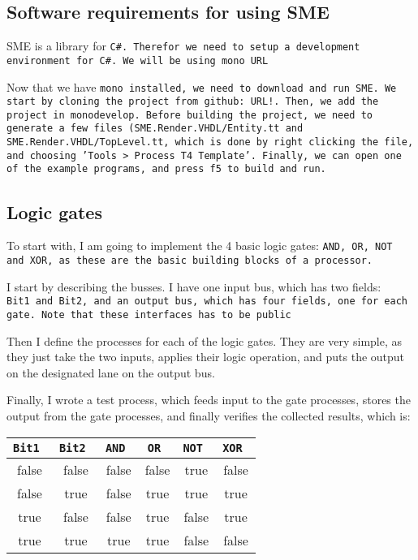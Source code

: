 \subsection{Software requirements for using SME}
SME is a library for \tt{C\#}. Therefor we need to setup a development
environment for \tt{C\#}. We will be using \tt{mono} URL %

Now that we have \tt{mono} installed, we need to download and run \tt{SME}. We
start by cloning the project from github: URL!. %
Then, we add the project in
\tt{monodevelop}. Before building the project, we need to generate a few files
(\tt{SME.Render.VHDL/Entity.tt} and \tt{SME.Render.VHDL/TopLevel.tt},
which is done by right clicking the file, and choosing 'Tools > Process T4
Template'. Finally, we can open one of the example programs, and press f5 to
build and run.


\subsection{Logic gates}
To start with, I am going to implement the 4 basic logic gates: \tt{AND},
\tt{OR}, \tt{NOT} and \tt{XOR}, as these are the basic building blocks of a
processor.

I start by describing the busses. I have one input bus, which has two fields:
\tt{Bit1} and \tt{Bit2}, and an output bus, which has four fields, one for each
gate. Note that these interfaces has to be public

Then I define the processes for each of the logic gates. They are very simple,
as they just take the two inputs, applies their logic operation, and puts the
output on the designated lane on the output bus.
%

Finally, I wrote a test process, which feeds input to the gate processes,
stores the output from the gate processes, and finally verifies the collected
results, which is:
\begin{tabular}{cc|cccc}
    \tt{Bit1} & \tt{Bit2} & \tt{AND} & \tt{OR} & \tt{NOT} & \tt{XOR} \\
    \hline
    false     & false     & false    & false   & true     & false \\
    false     & true      & false    & true    & true     & true  \\
    true      & false     & false    & true    & false    & true  \\
    true      & true      & true     & true    & false    & false \\
    \hline
\end{tabular}
%

